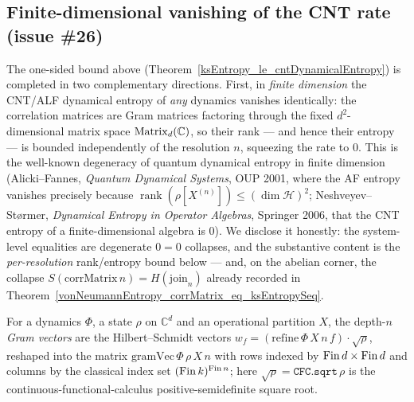 \subsection{Finite-dimensional vanishing of the CNT rate (issue \#26)}
\label{sec:cnt-finitedim}

The one-sided bound above (Theorem~\ref{ksEntropy_le_cntDynamicalEntropy}) is completed in two
complementary directions. First, in \emph{finite dimension} the CNT/ALF dynamical entropy of
\emph{any} dynamics vanishes identically: the correlation matrices are Gram matrices factoring
through the fixed \(d^{2}\)-dimensional matrix space \(\operatorname{Matrix}_d(\mathbb{C})\), so their rank --- and
hence their entropy --- is bounded independently of the resolution \(n\), squeezing the rate to
\(0\). This is the well-known degeneracy of quantum dynamical entropy in finite dimension
(Alicki--Fannes, \emph{Quantum Dynamical Systems}, OUP 2001, where the AF entropy vanishes precisely
because \(\operatorname{rank}(\rho[X^{(n)}])\le(\dim\mathcal H)^{2}\); Neshveyev--Størmer,
\emph{Dynamical Entropy in Operator Algebras}, Springer 2006, that the CNT entropy of a
finite-dimensional algebra is \(0\)). We disclose it honestly: the system-level equalities are
degenerate \(0 = 0\) collapses, and the substantive content is the \emph{per-resolution}
rank/entropy bound below --- and, on the abelian corner, the collapse
\(S(\mathrm{corrMatrix}\,n) = H(\text{join}_n)\) already recorded in
Theorem~\ref{vonNeumannEntropy_corrMatrix_eq_ksEntropySeq}.

\begin{definition}\label{gramVec}
  \leanok
  For a dynamics \(\Phi\), a state \(\rho\) on \(\mathbb{C}^{d}\) and an operational partition \(X\),
  the depth-\(n\) \emph{Gram vectors} are the Hilbert--Schmidt vectors
  \(w_f = (\mathrm{refine}\,\Phi\,X\,n\,f)\cdot\sqrt{\rho}\), reshaped into the matrix
  \(\mathrm{gramVec}\,\Phi\,\rho\,X\,n\) with rows indexed by \(\operatorname{Fin} d\times\operatorname{Fin} d\) and columns by
  the classical index set \((\operatorname{Fin} k)^{\operatorname{Fin} n}\); here \(\sqrt{\rho} = \texttt{CFC.sqrt}\,\rho\) is
  the continuous-functional-calculus positive-semidefinite square root.
\end{definition}

